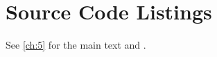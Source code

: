 \chapter{Source Code Listings}\label{app:C}
\lipsum[20-21]

See \cref{ch:5} for the main text and \citep{appx-1}.
